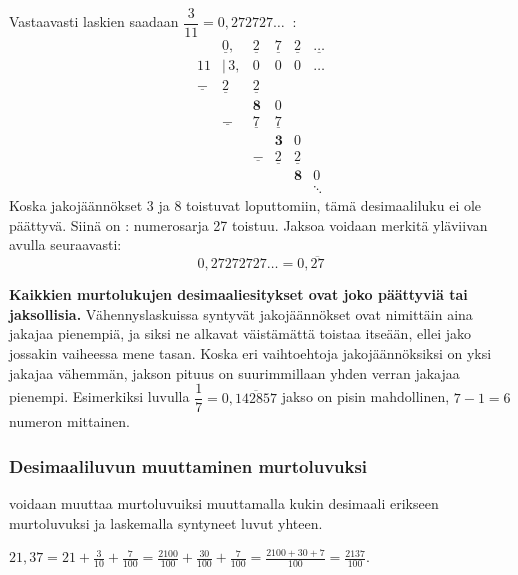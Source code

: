 Vastaavasti laskien saadaan $\dfrac{3}{11}=0,272727\ldots \ $ :
\[ 
\begin{array}{cccccc}
 & \underline{ 0}, & \underline{2} & \underline{7} & \underline{2} & 
 \underline{\ldots} \\
 11 & \!\!|\,3, & 0 & 0 & 0 & \ldots \\
 \underline{-} & \underline{2}& \underline{2} \\
 & & \boldsymbol{8} &0 \\
 & \underline{-} &\underline{ 7 }  & \underline{7} \\
 & & & \boldsymbol{3} & 0 \\
 & & \underline{-} & \underline{2} & \underline{2} \\
 & &  & & \boldsymbol{8} & 0 \\
 & & & & & \ddots
\end{array}
\]
Koska jakojäännökset 3 ja 8 toistuvat loputtomiin, tämä desimaaliluku
ei ole päättyvä. Siinä on : numerosarja 27 toistuu.
Jaksoa voidaan merkitä yläviivan avulla seuraavasti:
\[ 0,27272727\ldots = 0,\overline{27} \]

{\bf Kaikkien murtolukujen desimaaliesitykset ovat joko päättyviä tai jaksollisia.}
Vähennyslaskuissa syntyvät jakojäännökset ovat nimittäin aina jakajaa pienempiä, ja siksi
ne alkavat väistämättä toistaa itseään, ellei jako jossakin vaiheessa mene tasan.
Koska eri vaihtoehtoja jakojäännöksiksi on yksi jakajaa vähemmän,
jakson pituus on suurimmillaan yhden verran jakajaa pienempi. Esimerkiksi luvulla
$\dfrac{1}{7}=0,\overline{142857}$ jakso on pisin mahdollinen, $7-1=6$ numeron mittainen.


\subsubsection*{Desimaaliluvun muuttaminen murtoluvuksi}

 voidaan muuttaa murtoluvuiksi muuttamalla kukin
desimaali erikseen murtoluvuksi ja laskemalla syntyneet luvut yhteen.

\begin{esimerkki}
$21,37 = 21+ \frac{3}{10}+\frac{7}{100} =
\frac{2100}{100}+\frac{30}{100}+\frac{7}{100}
 = \frac{2100+30+7}{100} = \frac{2137}{100}.$
\end{esimerkki}

